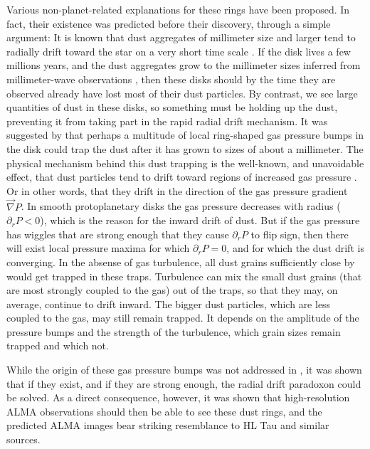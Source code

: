 \documentclass{aa}
\begin{document}
Various non-planet-related explanations for these rings have been proposed.  In
fact, their existence was predicted before their discovery, through a simple
argument: It is known that dust aggregates of millimeter size and larger tend to
radially drift toward the star on a very short time scale
\citep{1972fpp..conf..211W, 2007A&A...469.1169B}. If the disk lives a few
millions years, and the dust aggregates grow to the millimeter sizes inferred
from millimeter-wave observations \citep[e.g.][]{2016A&A...588A..53T}, then
these disks should by the time they are observed already have lost most of their
dust particles. By contrast, we see large quantities of dust in these disks, so
something must be holding up the dust, preventing it from taking part in the
rapid radial drift mechanism. It was suggested by \citet{2012A&A...538A.114P}
that perhaps a multitude of local ring-shaped gas pressure bumps in the disk
could trap the dust after it has grown to sizes of about a millimeter. The
physical mechanism behind this dust trapping is the well-known, and unavoidable
effect, that dust particles tend to drift toward regions of increased gas
pressure \citep[e.g.][]{1972fpp..conf..211W, 1976PThPh..56.1756A}. Or in other
words, that they drift in the direction of the gas pressure gradient $\vec\nabla
P$. In smooth protoplanetary disks the gas pressure decreases with radius
($\partial_r P<0$), which is the reason for the inward drift of dust. But if the
gas pressure has wiggles that are strong enough that they cause $\partial_r P$
to flip sign, then there will exist local pressure maxima for which $\partial_r P=0$,
and for which the dust drift is converging. In the absense of gas turbulence,
all dust grains sufficiently close by would get trapped in these
traps. Turbulence can mix the small dust grains (that are most strongly coupled
to the gas) out of the traps, so that they may, on average, continue to drift
inward. The bigger dust particles, which are less coupled to the gas, may still
remain trapped. It depends on the amplitude of the pressure bumps and the
strength of the turbulence, which grain sizes remain trapped and which not.

While the origin of these gas pressure bumps was not addressed in
\citet{2012A&A...538A.114P}, it was shown that if they exist, and if they
are strong enough, the radial drift paradoxon could be solved. As a direct
consequence, however, it was shown that high-resolution ALMA observations should
then be able to see these dust rings, and the predicted ALMA images bear
striking resemblance to HL Tau and similar sources.
\end{document}
